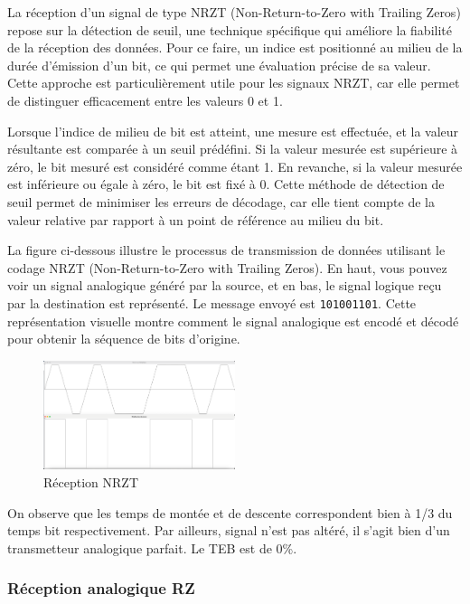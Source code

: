 La réception d'un signal de type NRZT (Non-Return-to-Zero with Trailing Zeros) repose sur la détection de seuil, une technique spécifique qui améliore la fiabilité de la réception des données. Pour ce faire, un indice est positionné au milieu de la durée d'émission d'un bit, ce qui permet une évaluation précise de sa valeur. Cette approche est particulièrement utile pour les signaux NRZT, car elle permet de distinguer efficacement entre les valeurs 0 et 1.

Lorsque l'indice de milieu de bit est atteint, une mesure est effectuée, et la valeur résultante est comparée à un seuil prédéfini. Si la valeur mesurée est supérieure à zéro, le bit mesuré est considéré comme étant 1. En revanche, si la valeur mesurée est inférieure ou égale à zéro, le bit est fixé à 0. Cette méthode de détection de seuil permet de minimiser les erreurs de décodage, car elle tient compte de la valeur relative par rapport à un point de référence au milieu du bit.

La figure ci-dessous illustre le processus de transmission de données utilisant le codage NRZT (Non-Return-to-Zero with Trailing Zeros). En haut, vous pouvez voir un signal analogique généré par la source,  et en bas, le signal logique reçu par la destination est représenté. Le message envoyé est \texttt{101001101}. Cette représentation visuelle montre comment le signal analogique est encodé et décodé pour obtenir la séquence de bits d'origine. 

\begin{figure}[H]
    \centering
    \includegraphics[width=0.5\textwidth]{img/etape2_reception_NRZT.png}
    \caption{Réception NRZT}
    \label{fig:reception_nrzt}
\end{figure}

On observe que les temps de montée et de descente correspondent bien à 1/3 du temps bit respectivement. Par ailleurs, signal n'est pas altéré, il s'agit bien d'un transmetteur analogique parfait. Le TEB est de 0\%.

\subsubsection{Réception analogique RZ}

